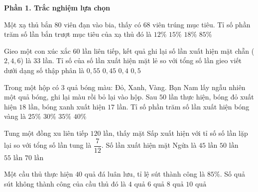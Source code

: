 \textbf{Phần 1. Trắc nghiệm lựa chọn}

\begin{ex} %
Một xạ thủ bắn $80$ viên đạn vào bia, thấy có $68$ viên trúng mục tiêu. Tỉ số phần trăm số lần bắn trượt mục tiêu của xạ thủ đó là
\choice
{$12\%$}
{\True $15\%$}
{$18\%$}
{$85\%$}
\end{ex}

\begin{ex} %
Gieo một con xúc xắc $60$ lần liên tiếp, kết quả ghi lại số lần xuất hiện mặt chẵn ($2, 4, 6$) là $33$ lần. Tỉ số của số lần xuất hiện mặt lẻ so với tổng số lần gieo viết dưới dạng số thập phân là
\choice
{$0{,}55$}
{\True $0{,}45$}
{$0{,}4$}
{$0{,}5$}
\end{ex}

\begin{ex} %
Trong một hộp có $3$ quả bóng màu: Đỏ, Xanh, Vàng. Bạn Nam lấy ngẫu nhiên một quả bóng, ghi lại màu rồi bỏ lại vào hộp. Sau $50$ lần thực hiện, bóng đỏ xuất hiện $18$ lần, bóng xanh xuất hiện $17$ lần. Tỉ số phần trăm số lần xuất hiện bóng vàng là
\choice
{$25\%$}
{\True $30\%$}
{$35\%$}
{$40\%$}
\end{ex}

\begin{ex} %
Tung một đồng xu liên tiếp $120$ lần, thấy mặt Sấp xuất hiện với tỉ số số lần lặp lại so với tổng số lần tung là $\dfrac{7}{12}$. Số lần xuất hiện mặt Ngửa là
\choice
{$45\text{ lần}$}
{\True $50\text{ lần}$}
{$55\text{ lần}$}
{$70\text{ lần}$}
\end{ex}

\begin{ex} %
Một cầu thủ thực hiện $40$ quả đá luân lưu, tỉ lệ sút thành công là $85\%$. Số quả sút không thành công của cầu thủ đó là
\choice
{$4\text{ quả}$}
{\True $6\text{ quả}$}
{$8\text{ quả}$}
{$10\text{ quả}$}
\end{ex}

